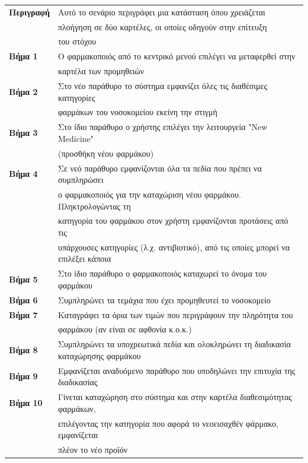 \documentclass{article}
\newcommand\T{\rule{0pt}{2.6ex}}       %
\newcommand\B{\rule[-1.2ex]{0pt}{0pt}}
\begin{document}
 \begin{center}
     \begin{tabular}{|l|l|}
     \hline
      \textbf{Περιγραφή} & Αυτό το σενάριο περιγράφει μια κατάσταση όπου χρειάζεται \T \\& πλοήγηση σε δύο καρτέλες, οι οποίες οδηγούν στην επίτευξη \\& του στόχου \B \\ 
      \hline
      \textbf{Βήμα 1} & Ο φαρμακοποιός από το κεντρικό μενού επιλέγει να μεταφερθεί στην \T \\& καρτέλα των προμηθειών \B \\
      \hline
      \textbf{Βήμα 2} & Στο νέο παράθυρο το σύστημα εμφανίζει όλες τις διαθέσιμες κατηγορίες \T \\& φαρμάκων του νοσοκομείου εκείνη την στιγμή \B \\
      \hline
      \textbf{Βήμα 3} & Στο ίδιο παράθυρο ο χρήστης επιλέγει την λειτουργεία "New Medicine" \T \\& (προσθήκη νέου φαρμάκου) \B \\
      \hline
      \textbf{Βήμα 4} & Σε νεό παράθυρο εμφανίζονται όλα τα πεδία που πρέπει να συμπληρώσει \T \\&  ο φαρμακοποιός για την καταχώριση νέου φαρμάκου. Πληκτρολογώντας τη \\& κατηγορία του φαρμάκου στον χρήστη εμφανίζονται προτάσεις από τις \\& υπάρχουσες κατηγορίες  (λ.χ. αντιβιοτικό), από τις οποίες μπορεί να επιλέξει κάποια \B \\
      \hline
      \textbf{Βήμα 5} & Στο ίδιο παράθυρο ο φαρμακοποιός καταχωρεί το όνομα του φαρμάκου \T\B \\
      \hline
      \textbf{Βήμα 6} &  Συμπληρώνει τα τεμάχια που έχει προμηθευτεί το νοσοκομείο \T\B \\
      \hline
      \textbf{Βήμα 7} & Καταγράφει τα όρια των τιμών που περιγράφουν την πληρότητα του \T \\& φαρμάκου (αν είναι σε αφθονία κ.ο.κ.)\B \\
      \hline
      \textbf{Βήμα 8} & Συμπληρώνει τα υποχρεωτικά πεδία και ολοκληρώνει τη διαδικασία καταχώρησης φαρμάκου \T\B \\
      \hline
      \textbf{Βήμα 9} & Εμφανίζεται αναδυόμενο παράθυρο που υποδηλώνει την επιτυχία της διαδικασίας \T\B \\
      \hline    
      \textbf{Βήμα 10} & Γίνεται καταχώρηση στο σύστημα και στην καρτέλα διαθεσιμότητας φαρμάκων, \T \\& επιλέγοντας την κατηγορία  που αφορά το νεοεισαχθέν φάρμακο, εμφανίζεται \\& πλέον το νέο προϊόν \B \\
      \hline
     \end{tabular}
 \end{center}
 
\end{document}
